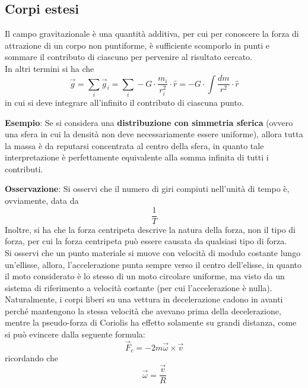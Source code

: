 \documentclass[a4paper]{extarticle}
\begin{document}
\vspace{1em}
\subsection{Corpi estesi}
Il campo gravitazionale è una quantità additiva, per cui per conoscere la forza di attrazione di un corpo non puntiforme, è sufficiente scomporlo in punti e sommare il contributo di ciascuno per pervenire al risultato cercato.\\
In altri termini si ha che
\[\boxed{\vec{g} = \sum_i \vec{g}_i = \sum_i - G \cdot \frac{m_i}{r_i^2} \cdot \hat{r} = -G \cdot \int \frac{dm}{r^2} \cdot \hat{r}}\]
in cui si deve integrare all'infinito il contributo di ciascuna punto.

\vspace{1em}
\noindent
\textbf{Esempio}: Se si considera una \textbf{distribuzione con simmetria sferica} (ovvero una sfera in cui la densità non deve necessariamente essere uniforme), allora tutta la massa è da reputarsi concentrata al centro della sfera, in quanto tale interpretazione è perfettamente equivalente alla somma infinita di tutti i contributi.

\vspace{1em}
\noindent
\textbf{Osservazione}: Si osservi che il numero di giri compiuti nell'unità di tempo è, ovviamente, data da
\[\frac{1}{T}\]
Inoltre, si ha che la forza centripeta descrive la natura della forza, non il tipo di forza, per cui la forza centripeta può essere causata da qualsiasi tipo di forza.\\
Si osservi che un punto materiale si muove con velocità di modulo costante lungo un'ellisse, allora, l'accelerazione punta sempre verso il centro dell'elisse, in quanto il moto considerato è lo stesso di un moto circolare uniforme, ma visto da un sistema di riferimento a velocità costante (per cui l'accelerazione è nulla).\\
Naturalmente, i corpi liberi su una vettura in decelerazione cadono in avanti perché mantengono la stessa velocità che avevano prima della decelerazione, mentre la pseudo-forza di Coriolis ha effetto solamente su grandi distanza, come si può evincere dalla seguente formula:
\[\vec F_c = -2 m  \vec \omega \times \vec v\]
ricordando che
\[\vec \omega = \frac{\vec v}{R}\]
\end{document}
